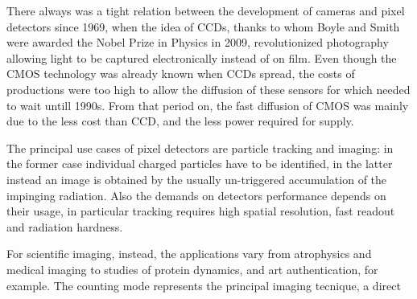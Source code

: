 There always was a tight relation between the development of cameras and pixel detectors since 1969, when the idea of CCDs, thanks to whom Boyle and Smith were awarded the Nobel Prize in Physics in 2009, revolutionized photography allowing light to be captured electronically instead of on film. 
Even though the CMOS technology was already known when CCDs spread, the costs of productions were too high to allow the diffusion of these sensors for which needed to wait untill 1990s. From that period on, the fast diffusion of CMOS was mainly due to the less cost than CCD, and the less power required for supply. 

The principal use cases of pixel detectors are particle tracking and imaging: in the former case individual charged particles have to be identified, in the latter instead an image is obtained by the usually un-triggered accumulation of the impinging radiation. 
Also the demands on detectors performance depends on their usage, in particular tracking requires high spatial resolution, fast readout and radiation hardness. 

For scientific imaging, instead, the applications vary from atrophysics and medical imaging to studies of protein dynamics,  and art authentication, for example. 
The counting mode represents the principal imaging tecnique, a direct 

